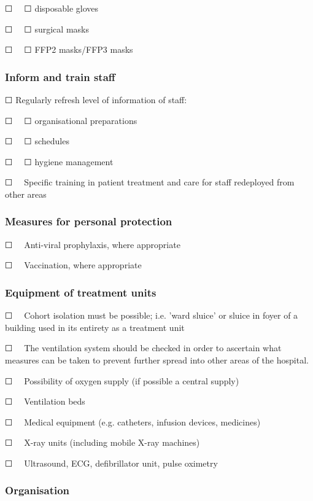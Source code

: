 \documentclass{article}
\begin{document}
☐   ☐ disposable gloves 


☐   ☐ surgical masks


☐   ☐ FFP2 masks/FFP3 masks 


\subsubsection{Inform and train staff}\label{H5485324}



☐ Regularly refresh level of information of staff: 


☐   ☐ organisational preparations


☐   ☐ schedules 


☐   ☐ hygiene management


☐   Specific training in patient treatment and care for staff redeployed from other areas


\subsubsection{Measures for personal protection}\label{H2576398}



☐   Anti-viral prophylaxis, where appropriate


☐   Vaccination, where appropriate 


\subsubsection{Equipment of treatment units}\label{H2443189}



☐   Cohort isolation must be possible; i.e. 'ward sluice' or sluice in foyer of a building used in its entirety as a treatment unit


☐   The ventilation system should be checked in order to ascertain what measures can be taken to prevent further spread into other areas of the hospital.


☐   Possibility of oxygen supply (if possible a central supply)


☐   Ventilation beds


☐   Medical equipment (e.g. catheters, infusion devices, medicines)


☐   X-ray units (including mobile X-ray machines)


☐   Ultrasound, ECG, defibrillator unit, pulse oximetry  


\subsubsection{Organisation}\label{H5831071}
\end{document}
